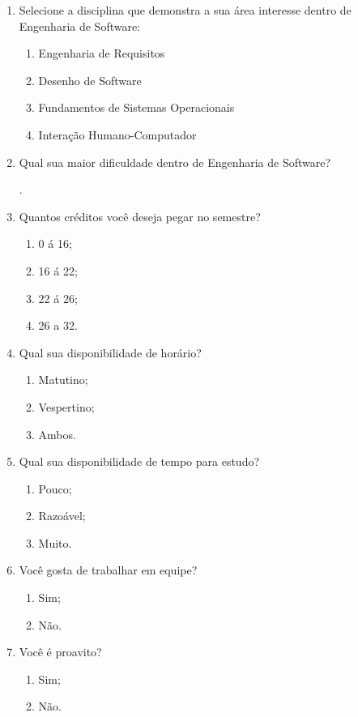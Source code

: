 	\begin{enumerate}
		\item Selecione a disciplina que demonstra a sua área interesse dentro de Engenharia de Software:

			\begin{enumerate}
				\item Engenharia de Requisitos
				\item Desenho de Software
				\item Fundamentos de Sistemas Operacionais
				\item Interação Humano-Computador
			\end{enumerate}

		\item Qual sua maior dificuldade dentro de Engenharia de Software?

			\underline{\hspace{13.8cm}}

			\underline{\hspace{13.8cm}}.

		\item Quantos créditos você deseja pegar no semestre?

			\begin{enumerate}
				\item 0 á 16;
				\item 16 á 22;
				\item 22 á 26;
				\item 26 a 32.
			\end{enumerate}

		\item Qual sua disponibilidade de horário?
			\begin{enumerate}
				\item Matutino;
				\item Vespertino;
				\item Ambos.
			\end{enumerate}

		\item Qual sua disponibilidade de tempo para estudo?
			\begin{enumerate}
				\item Pouco;
				\item Razoável;
				\item Muito.
			\end{enumerate}
		\item Você gosta de trabalhar em equipe?
			\begin{enumerate}
				\item Sim;
				\item Não.
			\end{enumerate}
		\item Você é proavito?
			\begin{enumerate}
				\item Sim;
				\item Não.
			\end{enumerate}
	\end{enumerate}

